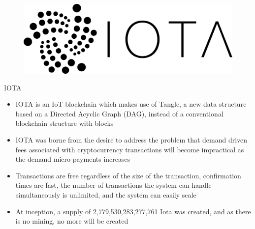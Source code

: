 \documentclass[9pt]{beamer}
\begin{document}
\begin{frame}
	\begin{figure}[]
		\centering
		\includegraphics  [scale=0.4]{Images/iota-logo}
	\end{figure}
\end{frame}


\begin{frame}{IOTA}
	\begin{itemize}
		\item IOTA is an IoT blockchain which makes use of Tangle, a new data structure based on a Directed Acyclic Graph (DAG), instead of a conventional blockchain structure  with blocks
		\item IOTA was borne from the desire to address the problem that demand driven fees associated with cryptocurrency transactions will become impractical as the demand micro-payments increases
		\item Transactions are free regardless of the size of the transaction, confirmation times are fast, the number of transactions the system can handle simultaneously is unlimited, and the system can easily scale
		\item At inception, a supply of 2,779,530,283,277,761 Iota was created, and as there is no mining, no more will be created
	\end{itemize}
\end{frame}

\end{document}

